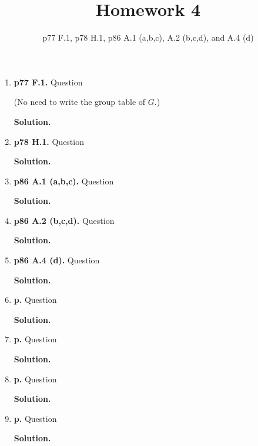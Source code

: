 \documentclass[11pt]{article}
\begin{document}
\title{Homework 4}
\date{p77 F.1, p78 H.1, p86 A.1 (a,b,c), A.2 (b,c,d), and A.4 (d)}
\maketitle

\thispagestyle{fancy}  
\pagestyle{fancy}      

\begin{enumerate}

\item {\bfseries p77 F.1.} Question

	(No need to write the group table of $G$.)
  
	{\bfseries Solution.}

\item {\bfseries p78 H.1.} Question
  
	{\bfseries Solution.}
  
\newpage

\item {\bfseries p86 A.1 (a,b,c).} Question
  
	{\bfseries Solution.}

\item {\bfseries p86 A.2 (b,c,d).} Question
  
	{\bfseries Solution.}

\item {\bfseries p86 A.4 (d).} Question
  
	{\bfseries Solution.}
  
\newpage

\item {\bfseries p.} Question
  
	{\bfseries Solution.}

\item {\bfseries p.} Question
  
	{\bfseries Solution.}

\item {\bfseries p.} Question
  
	{\bfseries Solution.}

\item {\bfseries p.} Question
  
	{\bfseries Solution.}
  
\newpage

\end{enumerate}
\end{document}
